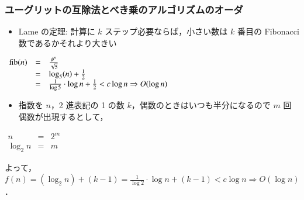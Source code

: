 \begin{frame}[shrink]
\frametitle{ユーグリットの互除法とべき乗のアルゴリズムのオーダ}
  \begin{example}[ユーグリットの互除法]
    \begin{itemize}
\item Lame の定理: 計算に $k$ ステップ必要ならば，小さい数は $k$ 番目の Fibonacci 数であるかそれより大きい
    \end{itemize}
    \begin{center}  
      \begin{math}
        \begin{array}{rcl}
\mathop{\mathrm{fib}}\nolimits(n)&=&\frac{\phi^{n}}{\sqrt{5}}\\
&=&\log_{5}(n)+\frac{1}{2}\\
&=&\frac{1}{\log 5}\cdot\log n+\frac{1}{2}<c\log n\Rightarrow O(\log n)
        \end{array}
      \end{math}
    \end{center}
  \end{example}
  \begin{example}[べき乗]
    \begin{itemize}
\item 指数を $n$，2 進表記の 1 の数 $k$，偶数のときはいつも半分になるので $m$ 回偶数が出現するとして，
    \end{itemize}
    \begin{center}
      \begin{math}
        \begin{array}{rcl}
n&=&2^m\\
\log_2 n &=& m
        \end{array}
      \end{math}
    \end{center}
よって， \(f(n)=(\log_2 n)+(k-1)=\frac{1}{\log 2}\cdot\log n+(k-1)<c\log n\Rightarrow O(\log n)\)．
  \end{example}
\end{frame}
